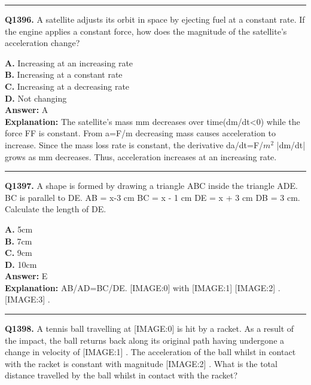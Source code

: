 \documentclass[12pt]{article}
\begin{document}
\hrule
\vspace{1em}


\noindent
\textbf{Q1396.} A satellite adjusts its orbit in space by ejecting fuel at a constant rate. If the engine applies a constant force, how does the magnitude of the satellite's acceleration change?



\textbf{A.} Increasing at an increasing rate \\
\textbf{B.} Increasing at a constant rate \\
\textbf{C.} Increasing at a decreasing rate \\
\textbf{D.} Not changing \\

\textbf{Answer:} A \\
\textbf{Explanation:} The satellite's mass mm decreases over time(dm/dt<0) while the force FF is constant. From a=F/m decreasing mass causes acceleration to increase. Since the mass loss rate is constant, the derivative da/dt=F/$m^2$ \cdot |dm/dt| grows as mm decreases. Thus, acceleration increases at an increasing rate.

\hrule
\vspace{1em}


\noindent
\textbf{Q1397.} A shape is formed by drawing a triangle ABC inside the triangle ADE. BC is parallel to DE. AB = x-3 cm BC = x - 1 cm DE = x + 3 cm DB = 3 cm.
Calculate the length of DE.



\textbf{A.} 5cm \\
\textbf{B.} 7cm \\
\textbf{C.} 9cm \\
\textbf{D.} 10cm \\

\textbf{Answer:} E \\
\textbf{Explanation:} AB/AD=BC/DE.
[IMAGE:0]
with
[IMAGE:1]
[IMAGE:2]
.
[IMAGE:3]
.

\hrule
\vspace{1em}


\noindent
\textbf{Q1398.} A tennis ball travelling at
[IMAGE:0]
is hit by a racket. As a result of the impact, the ball returns back along its original path having undergone a change in velocity of
[IMAGE:1]
. The acceleration of the ball whilst in contact with the racket is constant with magnitude
[IMAGE:2]
.
What is the total distance travelled by the ball whilst in contact with the racket?
\end{document}
